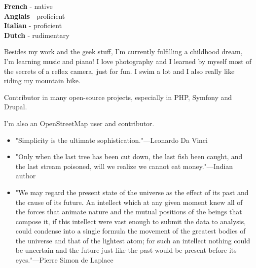 \begin{minipage}[t]{.2\textwidth}
	\vspace{-\baselineskip} %


	\textbf{French} - native\\
	\textbf{Anglais} - proficient\\
	\textbf{Italian} - proficient\\
	\textbf{Dutch} - rudimentary\\
\end{minipage}
\hfill
\begin{minipage}[t]{.45\textwidth}
	\vspace{-\baselineskip} %


    Besides my work and the geek stuff, I’m currently fulfilling a childhood dream, I’m learning music and piano!
    I love photography and I learned by myself most of the secrets of a reflex camera, just for fun.
    I swim a lot and I also really like riding my mountain bike.
\end{minipage}
\hfill
\begin{minipage}[t]{.30\textwidth}
	\vspace{-\baselineskip} %


    Contributor in many open-source projects, especially in PHP, Symfony and Drupal.

    I'm also an OpenStreetMap user and contributor.
\end{minipage}
\hfill
\begin{minipage}[t]{\textwidth}
	\vspace{-\baselineskip} %


    \begin{itemize}
        \item "Simplicity is the ultimate sophistication."{\tiny{---Leonardo Da Vinci}}
        \item "Only when the last tree has been cut down, the last fish been caught, and the last stream poisoned, will we realize we cannot eat money."{\tiny{---Indian author}}
        \item "We may regard the present state of the universe as the effect of its past and the cause of its future. An intellect which at any given moment knew all of the forces that animate nature and the mutual positions of the beings that compose it, if this intellect were vast enough to submit the data to analysis, could condense into a single formula the movement of the greatest bodies of the universe and that of the lightest atom; for such an intellect nothing could be uncertain and the future just like the past would be present before its eyes."{\tiny{---Pierre Simon de Laplace}}
    \end{itemize}
\end{minipage}

